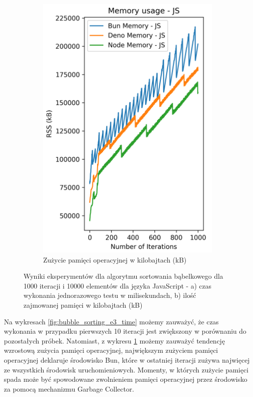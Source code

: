 \begin{figure}[H]
\begin{subfigure}[b]{0.44\textwidth}
  \end{subfigure}
  \begin{subfigure}[b]{0.44\textwidth}
    \centering
    \includegraphics[width=\textwidth]{Figures/sorting/sorting_bubble_1000_10000_js_memory.png}
    \caption{Zużycie pamięci operacyjnej w kilobajtach (kB)}
    \label{fig:bubble_sorting_e3_memory}
  \end{subfigure}
  \caption{Wyniki eksperymentów dla algorytmu sortowania bąbelkowego dla 1000 iteracji i 10000 elementów dla języka JavaScript - a) czas wykonania jednorazowego testu w milisekundach, b) ilość zajmowanej pamięci w kilobajtach (kB)}
  \label{fig:bubble_sorting_e3}
\end{figure}

Na wykresach \ref{fig:bubble_sorting_e3_time} możemy zauważyć, że czas wykonania w przypadku pierwszych 10 iteracji jest zwiększony w porównaniu do pozostałych próbek. Natomiast, z wykresu \ref{fig:bubble_sorting_e3_memory} możemy zauważyć tendencję wzrostową zużycia pamięci operacyjnej, największym zużyciem pamięci operacyjnej deklaruje środowisko Bun, które w ostatniej iteracji zużywa najwięcej ze wszystkich środowisk uruchomieniowych. Momenty, w których zużycie pamięci spada może być spowodowane zwolnieniem pamięci operacyjnej przez środowisko za pomocą mechanizmu Garbage Collector.

